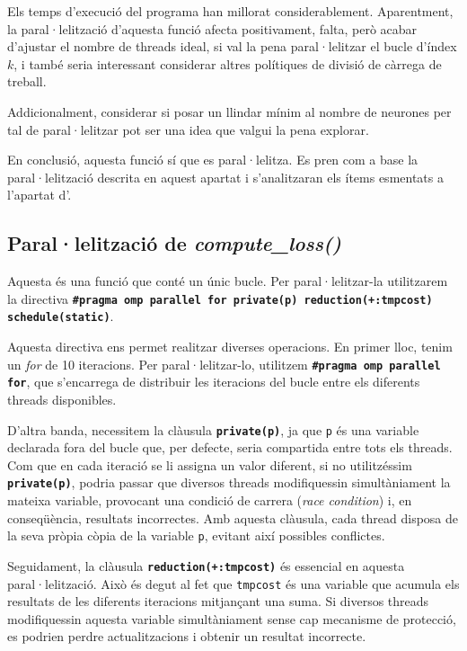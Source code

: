 \documentclass{article}
\begin{document}
Els temps d'execució del programa han millorat considerablement. Aparentment, la paral·lelització d'aquesta funció afecta positivament, falta, però acabar d'ajustar el nombre de threads ideal, si val la pena paral·lelitzar el bucle d'índex $k$, i també seria interessant considerar altres polítiques de divisió de càrrega de treball.

Addicionalment, considerar si posar un llindar mínim al nombre de neurones per tal de paral·lelitzar pot ser una idea que valgui la pena explorar.

En conclusió, aquesta funció sí que es paral·lelitza. Es pren com a base la paral·lelització descrita en aquest apartat i s'analitzaran els ítems esmentats a l'apartat d'\texttt{}.

\subsection{Paral·lelització de \textit{compute\_loss()}}

Aquesta és una funció que conté un únic bucle. Per paral·lelitzar-la utilitzarem la directiva \textbf{\texttt{\#pragma omp parallel for private(p) reduction(+:tmpcost) schedule(static)}}.

Aquesta directiva ens permet realitzar diverses operacions. En primer lloc, tenim un \textit{for} de 10 iteracions. Per paral·lelitzar-lo, utilitzem \textbf{\texttt{\#pragma omp parallel for}}, que s'encarrega de distribuir les iteracions del bucle entre els diferents threads disponibles.

D'altra banda, necessitem la clàusula \textbf{\texttt{private(p)}}, ja que \texttt{p} és una variable declarada fora del bucle que, per defecte, seria compartida entre tots els threads. Com que en cada iteració se li assigna un valor diferent, si no utilitzéssim  \textbf{\texttt{private(p)}}, podria passar que diversos threads modifiquessin simultàniament la mateixa variable, provocant una condició de carrera (\textit{race condition}) i, en conseqüència, resultats incorrectes. Amb aquesta clàusula, cada thread disposa de la seva pròpia còpia de la variable \texttt{p}, evitant així possibles conflictes.

Seguidament, la clàusula \textbf{\texttt{reduction(+:tmpcost)}} és essencial en aquesta paral·lelització. Això és degut al fet que \texttt{tmpcost} és una variable que acumula els resultats de les diferents iteracions mitjançant una suma. Si diversos threads modifiquessin aquesta variable simultàniament sense cap mecanisme de protecció, es podrien perdre  actualitzacions i obtenir un resultat incorrecte.
\end{document}
